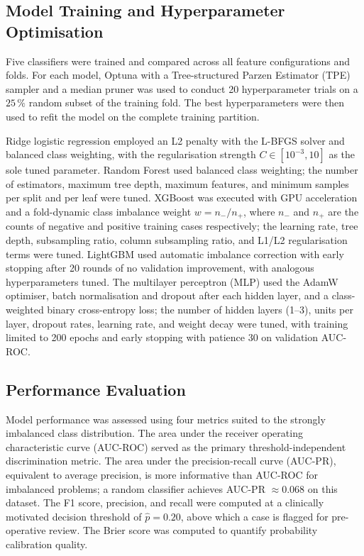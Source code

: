 \subsection{Model Training and Hyperparameter Optimisation}
\label{sec:models}

Five classifiers were trained and compared across all feature configurations
and folds.  For each model, Optuna \citep{akiba2019optuna} with a
Tree-structured Parzen Estimator (TPE) sampler and a median pruner was used
to conduct 20 hyperparameter trials on a $25\,\%$ random subset of the
training fold.  The best hyperparameters were then used to refit the model on
the complete training partition.

Ridge logistic regression employed an L2 penalty with the L-BFGS solver and
balanced class weighting, with the regularisation strength
$C \in [10^{-3}, 10]$ as the sole tuned parameter.  Random Forest used
balanced class weighting; the number of estimators, maximum tree depth,
maximum features, and minimum samples per split and per leaf were tuned.
XGBoost was executed with GPU acceleration and a fold-dynamic class imbalance
weight $w = n_{-}/n_{+}$, where $n_{-}$ and $n_{+}$ are the counts of
negative and positive training cases respectively; the learning rate, tree
depth, subsampling ratio, column subsampling ratio, and L1/L2 regularisation
terms were tuned.  LightGBM used automatic imbalance correction with early
stopping after 20 rounds of no validation improvement, with analogous
hyperparameters tuned.  The multilayer perceptron (MLP) used the
AdamW optimiser, batch normalisation and dropout after each hidden layer, and a
class-weighted binary cross-entropy loss; the number of hidden layers (1--3),
units per layer, dropout rates, learning rate, and weight decay were tuned,
with training limited to 200 epochs and early stopping with patience 30 on
validation AUC-ROC.

\subsection{Performance Evaluation}
\label{sec:eval}

Model performance was assessed using four metrics suited to the strongly
imbalanced class distribution.  The area under the receiver operating
characteristic curve (AUC-ROC) served as the primary threshold-independent
discrimination metric.  The area under the precision-recall curve (AUC-PR),
equivalent to average precision, is more informative than AUC-ROC for
imbalanced problems; a random classifier achieves AUC-PR $\approx 0.068$ on
this dataset.  The F1 score, precision, and recall were computed at a
clinically motivated decision threshold of $\hat{p} = 0.20$, above which a
case is flagged for pre-operative review.  The Brier score was computed to
quantify probability calibration quality.

